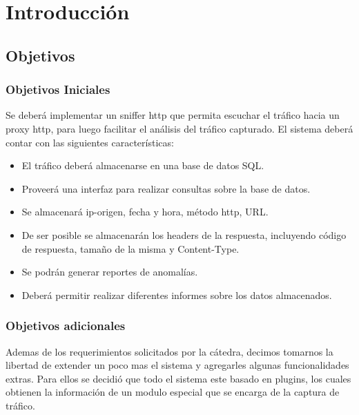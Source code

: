 \section{Introducción}

\subsection{Objetivos}

\subsubsection{Objetivos Iniciales}

 Se deberá implementar un sniffer http que permita escuchar el tráfico hacia un proxy http, para luego facilitar el análisis del tráfico capturado. El sistema deberá contar con las siguientes características:
\\
\begin{itemize}
	\item El tráfico deberá almacenarse en una base de datos SQL.
	\item Proveerá una interfaz para realizar consultas sobre la base de datos.
	\item Se almacenará ip-origen, fecha y hora, método http, URL.
	\item De ser posible se almacenarán los headers de la respuesta, incluyendo código de respuesta, tamaño de la misma y Content-Type.
	\item Se podrán generar reportes de anomalías.
	\item Deberá permitir realizar diferentes informes sobre los datos almacenados.
\end{itemize}

\subsubsection{Objetivos adicionales}
Ademas de los requerimientos solicitados por la cátedra, decimos tomarnos la libertad de extender un poco mas el sistema y agregarles algunas funcionalidades extras. Para ellos se decidió que todo el sistema este basado en plugins, los cuales obtienen la información de un modulo especial que se encarga de la captura de tráfico.

